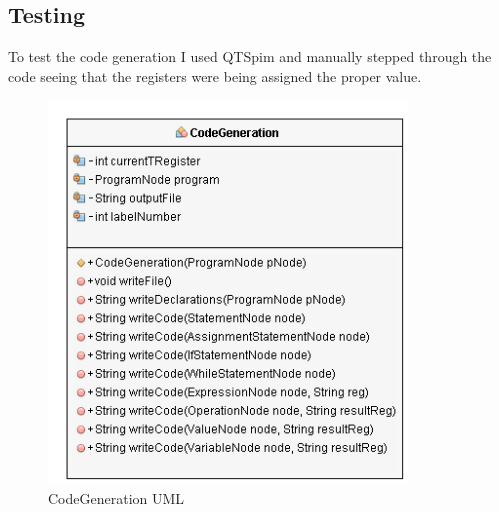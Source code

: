 \documentclass[10]{article}
\begin{document}
\subsection{Testing}
To test the code generation I used QTSpim and manually stepped through the code seeing that the registers were being assigned the proper value. 

\begin{figure}[!ht]
	\includegraphics[height=4in]{CodeGen.png}
	\caption{CodeGeneration UML }
\end{figure}
\end{document}
